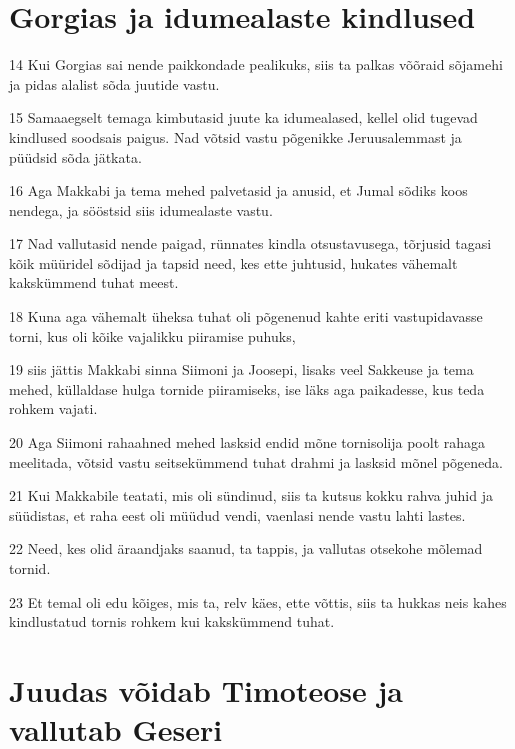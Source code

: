 \section*{Gorgias ja idumealaste kindlused}

\par 14 Kui Gorgias sai nende paikkondade pealikuks, siis ta palkas võõraid sõjamehi ja pidas alalist sõda juutide vastu.
\par 15 Samaaegselt temaga kimbutasid juute ka idumealased, kellel olid tugevad kindlused soodsais paigus. Nad võtsid vastu põgenikke Jeruusalemmast ja püüdsid sõda jätkata.
\par 16 Aga Makkabi ja tema mehed palvetasid ja anusid, et Jumal sõdiks koos nendega, ja sööstsid siis idumealaste vastu.
\par 17 Nad vallutasid nende paigad, rünnates kindla otsustavusega, tõrjusid tagasi kõik müüridel sõdijad ja tapsid need, kes ette juhtusid, hukates vähemalt kakskümmend tuhat meest.
\par 18 Kuna aga vähemalt üheksa tuhat oli põgenenud kahte eriti vastupidavasse torni, kus oli kõike vajalikku piiramise puhuks,
\par 19 siis jättis Makkabi sinna Siimoni ja Joosepi, lisaks veel Sakkeuse ja tema mehed, küllaldase hulga tornide piiramiseks, ise läks aga paikadesse, kus teda rohkem vajati.
\par 20 Aga Siimoni rahaahned mehed lasksid endid mõne tornisolija poolt rahaga meelitada, võtsid vastu seitsekümmend tuhat drahmi ja lasksid mõnel põgeneda.
\par 21 Kui Makkabile teatati, mis oli sündinud, siis ta kutsus kokku rahva juhid ja süüdistas, et raha eest oli müüdud vendi, vaenlasi nende vastu lahti lastes.
\par 22 Need, kes olid äraandjaks saanud, ta tappis, ja vallutas otsekohe mõlemad tornid.
\par 23 Et temal oli edu kõiges, mis ta, relv käes, ette võttis, siis ta hukkas neis kahes kindlustatud tornis rohkem kui kakskümmend tuhat.


\section*{Juudas võidab Timoteose ja vallutab Geseri}

